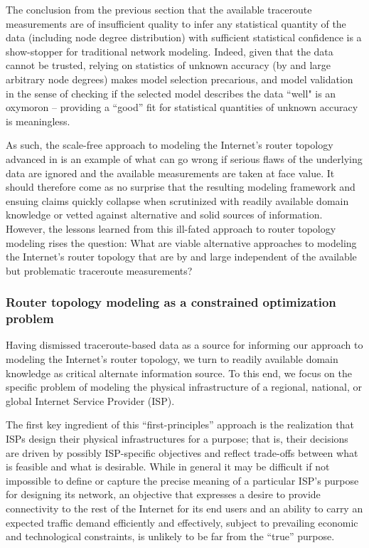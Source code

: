 The conclusion from the previous section that the available traceroute measurements 
are of insufficient quality to infer any statistical quantity of the data (including
node degree distribution) with sufficient statistical confidence is a show-stopper 
for traditional network modeling.  Indeed, given that the data cannot be trusted, 
relying on statistics of unknown accuracy (\eg by and large arbitrary node degrees) makes 
model selection precarious, and model validation in the sense of checking if
the selected model describes the data ``well" is an oxymoron -- providing a ``good'' fit
for statistical quantities of unknown accuracy is meaningless.  

As such, the scale-free approach to modeling 
the Internet's router topology advanced in \cite{barabasi00} is an example of what can go wrong
if serious flaws of the underlying data are ignored and the available measurements 
are taken at face value.  It should therefore come as no surprise that the resulting
modeling framework and ensuing claims quickly collapse when scrutinized with readily
available domain knowledge or vetted against alternative and solid sources of information.
However, the lessons learned from this ill-fated approach to router topology modeling
rises the question: What are viable alternative approaches to modeling the Internet's
router topology that are by and large independent of the available but problematic
traceroute measurements? 


\subsubsection{Router topology modeling as a constrained optimization problem}

Having dismissed traceroute-based data as a source for informing our approach to 
modeling the Internet's router topology, we turn to readily available domain 
knowledge as critical alternate information source.  To this end, we focus on 
the specific problem of modeling the physical infrastructure of a regional,
national, or global Internet Service Provider (ISP).

The first key ingredient of this ``first-principles'' approach is the
realization that ISPs design their physical infrastructures for a
purpose; that is, their decisions are driven by possibly ISP-specific
objectives and reflect trade-offs between what is feasible and what is
desirable. While in general it may be difficult if not impossible to
define or capture the precise meaning of a particular ISP's purpose
for designing its network, an objective that expresses a desire to
provide connectivity to the rest of the Internet for its end users and
an ability to carry an expected traffic demand efficiently and
effectively, subject to prevailing economic and technological
constraints, is unlikely to be far from the ``true'' purpose.

